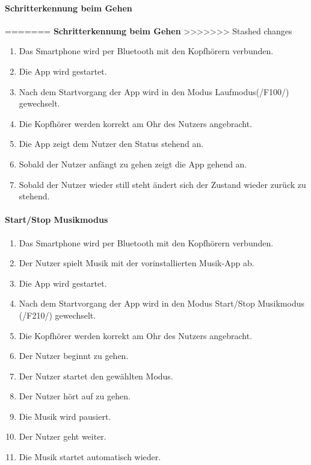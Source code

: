 \documentclass[a4paper,12pt]{article}
\begin{document}
\begin{itemize}
  \paragraph{Schritterkennung beim Gehen}
=======
  \textbf{Schritterkennung beim Gehen}%
>>>>>>> Stashed changes
  \begin{enumerate}
    \item Das Smartphone wird per Bluetooth mit den Kopfhörern verbunden.
    \item Die App wird gestartet.
    \item Nach dem Startvorgang der App wird in den Modus \glqq Laufmodus\grqq{}(/F100/) gewechselt.
    \item Die Kopfhörer werden korrekt am Ohr des Nutzers angebracht.
    \item Die App zeigt dem Nutzer den Status \glqq stehend\grqq{} an.
    \item Sobald der Nutzer anfängt zu gehen zeigt die App \glqq gehend\grqq{} an.
    \item Sobald der Nutzer wieder still steht ändert sich der Zustand wieder zurück zu \glqq stehend\grqq. 
  \end{enumerate}

  \paragraph{Start/Stop Musikmodus}
  \begin{enumerate}
    \item Das Smartphone wird per Bluetooth mit den Kopfhörern verbunden.
    \item Der Nutzer spielt Musik mit der vorinstallierten Musik-App ab.
    \item Die App wird gestartet.
    \item Nach dem Startvorgang der App wird in den Modus \glqq Start/Stop Musikmodus\grqq{} (/F210/) gewechselt.
    \item Die Kopfhörer werden korrekt am Ohr des Nutzers angebracht.
    \item Der Nutzer beginnt zu gehen.
    \item Der Nutzer startet den gewählten Modus.
    \item Der Nutzer hört auf zu gehen.
    \item Die Musik wird pausiert.
    \item Der Nutzer geht weiter.
    \item Die Musik startet automatisch wieder.
  \end{enumerate}


\end{itemize}
\end{document}
